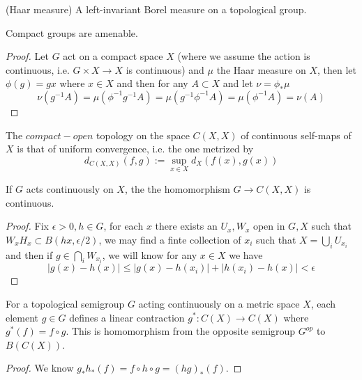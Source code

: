 \documentclass[lang=en, color=blue, ]{elegantbook}
\begin{document}
\begin{definition}
    (Haar measure) A left-invariant Borel measure on a topological group.
\end{definition}

\begin{corollary}
    Compact groups are amenable. 
\end{corollary}

\begin{proof}\par
    Let $G$ act on a compact space $X$ (where we assume the action is continuous, i.e. $G\times X \to X$ is continuous) and $\mu$ the Haar measure on $X$, then let $\phi(g) = gx$  where $x\in X$ and then for any $A\subset X$ and let $\nu = \phi_*\mu$
    \[\nu(g^{-1}A) = \mu(\phi^{-1}g^{-1}A) = \mu(g^{-1}\phi^{-1} A) = \mu(\phi^{-1}A) = \nu(A)\]
\end{proof}

\begin{definition}
    The $compact-open$ topology on the space $C(X,X)$ of continuous self-maps of $X$ is that of uniform convergence, i.e. the one metrized by
    \[d_{C(X,X)}(f,g) := \sup_{x\in X}d_X(f(x),g(x))\]
\end{definition}

\begin{lemma}
    If $G$ acts continuously on $X$, the the homomorphism $G\to C(X,X)$ is continuous.
\end{lemma}

\begin{proof}\par
    Fix $\epsilon >0, h\in G$, for each $x$ there exists an $U_x, W_x$ open in $G,X$ such that $W_x H_x \subset B(hx,\epsilon/2)$, we may find a finte collection of $x_i$ such that $X =\bigcup_i U_{x_i}$ and then if $g\in \bigcap_i W_{x_i}$, we will know for any $x\in X$ we have
    \[
    |g(x)-h(x)| \leq |g(x)-h(x_i)|+|h(x_i)-h(x)| < \epsilon
    \]
\end{proof}

\begin{definition}
    For a topological semigroup $G$ acting continuously on a metric space $X$, each element $g\in G$ defines a linear contraction $g^*:C(X) \to C(X)$ where $g^*(f) = f\circ g$. This is homomorphism from the opposite semigroup $G^{op}$ to $B(C(X))$.
\end{definition}

\begin{proof}\par
    We know $g_* h_*(f) = f\circ h \circ g = (hg)_* (f)$.
\end{proof}
\end{document}
